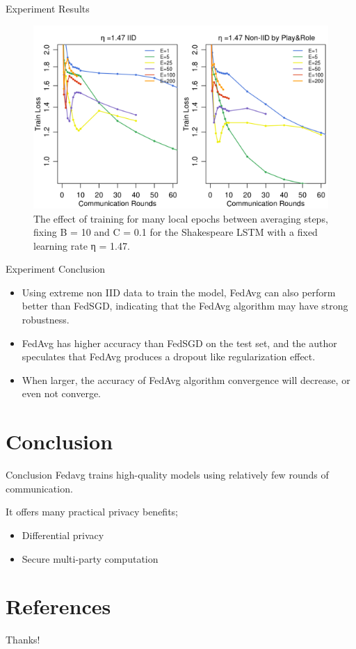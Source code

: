 \documentclass{beamer}
\begin{document}
\begin{frame}{Experiment Results}
	\begin{figure}[htbp]
		\centering
		\includegraphics[scale=0.7]{table3.png}
		\caption{The effect of training for many local epochs between averaging steps, fixing B = 10 and C = 0.1 for
			the Shakespeare LSTM with a fixed learning rate η = 1.47.}
	\end{figure}
\end{frame}

\begin{frame}{Experiment Conclusion}
	\begin{itemize}
		\item Using extreme non IID data to train the model, FedAvg can also perform better than FedSGD, indicating that the FedAvg algorithm may have strong robustness.
		\item FedAvg has higher accuracy than FedSGD on the test set, and the author speculates that FedAvg produces a dropout like regularization effect.
		\item When larger, the accuracy of FedAvg algorithm convergence will decrease, or even not converge.
	\end{itemize}
\end{frame}

\section{Conclusion}
\begin{frame}{Conclusion}
	Fedavg trains high-quality models using relatively few rounds of communication.

	It offers many practical privacy benefits;

	\begin{itemize}
		\item Differential privacy
		\item Secure multi-party computation
	\end{itemize}
\end{frame}

\section{References}

\begin{frame}[allowframebreaks]
	
	
\end{frame}

\begin{frame}
	\begin{center}
		{\Huge \calligra Thanks!}
	\end{center}
\end{frame}
\end{document}
